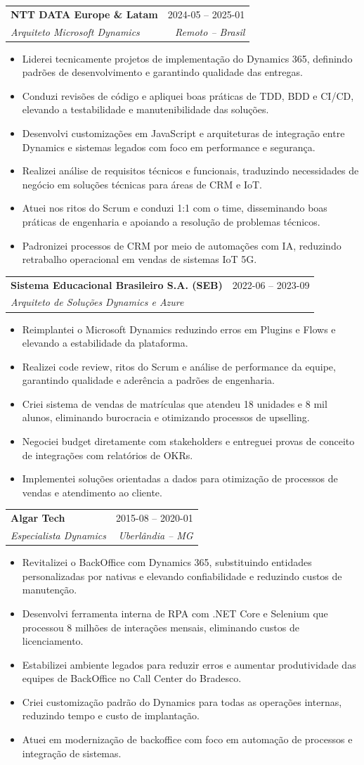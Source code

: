 \documentclass[a4paper,11pt]{article}
\makeatletter
\newcommand{\resumeItem}[1]{
  \item\small{
    {#1 \vspace{-2pt}}
  }
}
\newcommand{\resumeSubheading}[4]{
  \vspace{-1pt}\item
  \begin{tabular*}{0.97\textwidth}{l@{\extracolsep{\fill}}r}
    \textbf{#1} & #2 \\
    \textit{\small#3} & \textit{\small #4} \\
  \end{tabular*}\vspace{-5pt}
}
\newcommand{\resumeItemListStart}{\begin{itemize}}
\newcommand{\resumeItemListEnd}{\end{itemize}\vspace{-5pt}}
\makeatother
\begin{document}
\resumeSubheading
{NTT DATA Europe \& Latam}{2024-05 – 2025-01}
{Arquiteto Microsoft Dynamics}{Remoto – Brasil}
\resumeItemListStart
\resumeItem{Liderei tecnicamente projetos de implementação do Dynamics 365, definindo padrões de desenvolvimento e garantindo qualidade das entregas.}
\resumeItem{Conduzi revisões de código e apliquei boas práticas de TDD, BDD e CI/CD, elevando a testabilidade e manutenibilidade das soluções.}
\resumeItem{Desenvolvi customizações em JavaScript e arquiteturas de integração entre Dynamics e sistemas legados com foco em performance e segurança.}
\resumeItem{Realizei análise de requisitos técnicos e funcionais, traduzindo necessidades de negócio em soluções técnicas para áreas de CRM e IoT.}
\resumeItem{Atuei nos ritos do Scrum e conduzi 1:1 com o time, disseminando boas práticas de engenharia e apoiando a resolução de problemas técnicos.}
\resumeItem{Padronizei processos de CRM por meio de automações com IA, reduzindo retrabalho operacional em vendas de sistemas IoT 5G.}
\resumeItemListEnd

\resumeSubheading
{Sistema Educacional Brasileiro S.A. (SEB)}{2022-06 – 2023-09}
{Arquiteto de Soluções Dynamics e Azure}{}
\resumeItemListStart
\resumeItem{Reimplantei o Microsoft Dynamics reduzindo erros em Plugins e Flows e elevando a estabilidade da plataforma.}
\resumeItem{Realizei code review, ritos do Scrum e análise de performance da equipe, garantindo qualidade e aderência a padrões de engenharia.}
\resumeItem{Criei sistema de vendas de matrículas que atendeu 18 unidades e 8 mil alunos, eliminando burocracia e otimizando processos de upselling.}
\resumeItem{Negociei budget diretamente com stakeholders e entreguei provas de conceito de integrações com relatórios de OKRs.}
\resumeItem{Implementei soluções orientadas a dados para otimização de processos de vendas e atendimento ao cliente.}
\resumeItemListEnd

\resumeSubheading
{Algar Tech}{2015-08 – 2020-01}
{Especialista Dynamics}{Uberlândia – MG}
\resumeItemListStart
\resumeItem{Revitalizei o BackOffice com Dynamics 365, substituindo entidades personalizadas por nativas e elevando confiabilidade e reduzindo custos de manutenção.}
\resumeItem{Desenvolvi ferramenta interna de RPA com .NET Core e Selenium que processou 8 milhões de interações mensais, eliminando custos de licenciamento.}
\resumeItem{Estabilizei ambiente legados para reduzir erros e aumentar produtividade das equipes de BackOffice no Call Center do Bradesco.}
\resumeItem{Criei customização padrão do Dynamics para todas as operações internas, reduzindo tempo e custo de implantação.}
\resumeItem{Atuei em modernização de backoffice com foco em automação de processos e integração de sistemas.}
\resumeItemListEnd
\end{document}
